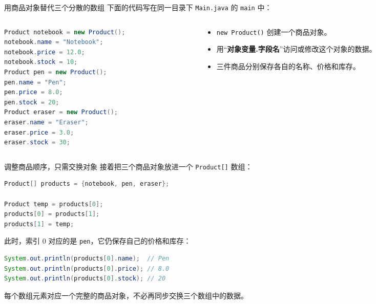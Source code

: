 \documentclass[aspectratio=169]{beamer}
\begin{document}
\begin{frame}[fragile]{用商品对象替代三个分散的数组}
  下面的代码写在同一目录下 \texttt{Main.java} 的 \texttt{main} 中：
  \par\medskip
  \begin{columns}[T,onlytextwidth]
    \begin{column}{0.55\textwidth}
      \begin{lstlisting}[language=Java]
Product notebook = new Product();
notebook.name = "Notebook";
notebook.price = 12.0;
notebook.stock = 10;
Product pen = new Product();
pen.name = "Pen";
pen.price = 8.0;
pen.stock = 20;
Product eraser = new Product();
eraser.name = "Eraser";
eraser.price = 3.0;
eraser.stock = 30;
      \end{lstlisting}
    \end{column}
    \begin{column}{0.41\textwidth}
      \begin{itemize}
        \item \texttt{new Product()} 创建一个商品对象。
        \item 用“\textbf{对象变量.字段名}”访问或修改这个对象的数据。
        \item 三件商品分别保存各自的名称、价格和库存。
      \end{itemize}
    \end{column}
  \end{columns}
\end{frame}

\begin{frame}[fragile]{调整商品顺序，只需交换对象}
  接着把三个商品对象放进一个 \texttt{Product[]} 数组：
  \begin{lstlisting}[language=Java]
Product[] products = {notebook, pen, eraser};

Product temp = products[0];
products[0] = products[1];
products[1] = temp;
  \end{lstlisting}
  此时，索引 0 对应的是 \texttt{pen}，它仍保存自己的价格和库存：
  \begin{lstlisting}[language=Java]
System.out.println(products[0].name);  // Pen
System.out.println(products[0].price); // 8.0
System.out.println(products[0].stock); // 20
  \end{lstlisting}
  \medskip
  每个数组元素对应\alert{一个完整的商品对象}，不必再同步交换三个数组中的数据。
\end{frame}
\end{document}
